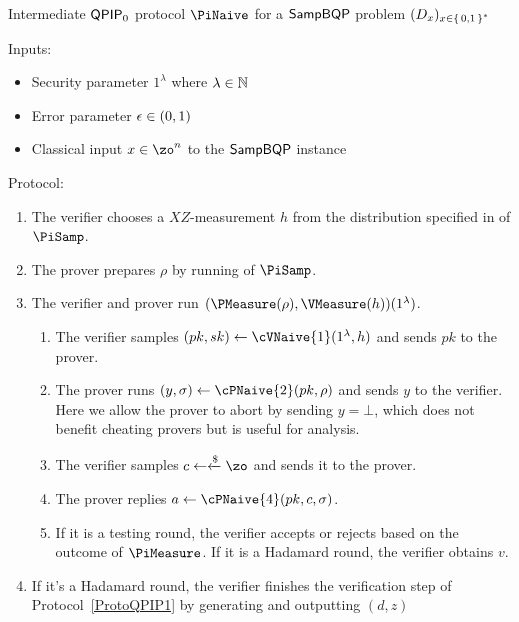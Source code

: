 \begin{protocol}{Intermediate $\operatorname{\mathsf{QPIP}}_0$ protocol $\PiNaive$ for a $\operatorname{\mathsf{SampBQP}}$ problem $(D_x)_{x\in\set{0, 1}^*}$}
	\label{proto:qpip0_naive}

	Inputs:
	\begin{itemize}
		\item Security parameter $1^\lambda$ where $\lambda\in\mathbb{N}$
		\item Error parameter $\epsilon\in(0, 1)$
		\item Classical input $x\in\zo^n$ to the $\operatorname{\mathsf{SampBQP}}$ instance
	\end{itemize}

	Protocol:
	\begin{enumerate}
		\item \label{step:naive1} The verifier chooses a $XZ$-measurement $h$ from the distribution specified in  of $\PiSamp$.
		\item \label{step:naive2} The prover prepares $\rho$ by running  of $\PiSamp$.
		\item \label{step:urmila-in-naive}
			The verifier and prover run $(\PMeasure(\rho), \VMeasure(h))(1^\lambda)$.
			\begin{enumerate}
				\item The verifier samples $(pk, sk)\leftarrow\cVNaive{1}(1^\lambda, h)$ and sends $pk$ to the prover.
				\item The prover runs $(y, \sigma)\leftarrow\cPNaive{2}(pk, \rho)$ and sends $y$ to the verifier.
					Here we allow the prover to abort by sending $y=\bot$, which does not benefit cheating provers but is useful for analysis.
				\item\label{step:c-urmila-in-naive} The verifier samples $c\leftarrow\xleftarrow{\$}\zo$ and sends it to the prover.
				\item The prover replies $a\leftarrow\cPNaive{4}(pk, c, \sigma)$.
				\item
					If it is a testing round, the verifier accepts or rejects based on the outcome of $\PiMeasure$.
					If it is a Hadamard round, the verifier obtains $v$.
			\end{enumerate}
		\item \label{step:naive-output} If it's a Hadamard round, the verifier finishes the verification step of Protocol~\ref{ProtoQPIP1} by generating and outputting $(d, z)$
	\end{enumerate}
\end{protocol}


